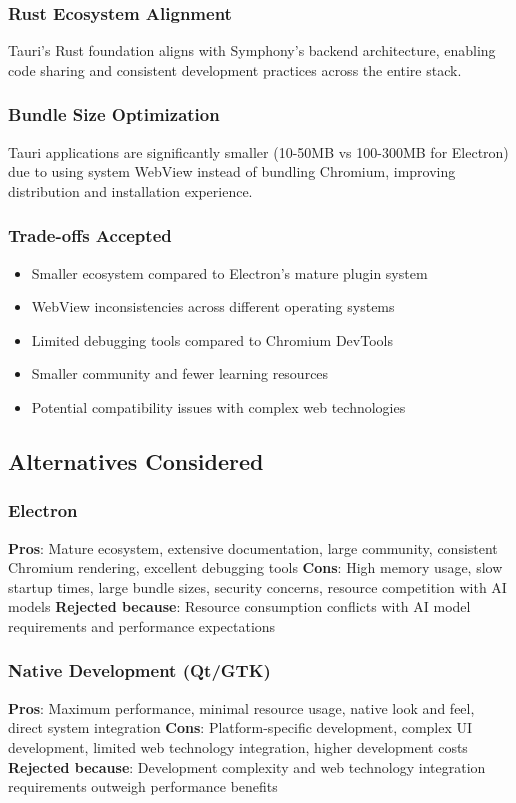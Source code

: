 \subsubsection*{Rust Ecosystem Alignment}
Tauri's Rust foundation aligns with Symphony's backend architecture, enabling code sharing and consistent development practices across the entire stack.

\subsubsection*{Bundle Size Optimization}
Tauri applications are significantly smaller (10-50MB vs 100-300MB for Electron) due to using system WebView instead of bundling Chromium, improving distribution and installation experience.

\subsubsection*{Trade-offs Accepted}
\begin{itemize}
\item Smaller ecosystem compared to Electron's mature plugin system
\item WebView inconsistencies across different operating systems
\item Limited debugging tools compared to Chromium DevTools
\item Smaller community and fewer learning resources
\item Potential compatibility issues with complex web technologies
\end{itemize}

\subsection*{Alternatives Considered}

\subsubsection*{Electron}
\textbf{Pros}: Mature ecosystem, extensive documentation, large community, consistent Chromium rendering, excellent debugging tools
\textbf{Cons}: High memory usage, slow startup times, large bundle sizes, security concerns, resource competition with AI models
\textbf{Rejected because}: Resource consumption conflicts with AI model requirements and performance expectations

\subsubsection*{Native Development (Qt/GTK)}
\textbf{Pros}: Maximum performance, minimal resource usage, native look and feel, direct system integration
\textbf{Cons}: Platform-specific development, complex UI development, limited web technology integration, higher development costs
\textbf{Rejected because}: Development complexity and web technology integration requirements outweigh performance benefits

